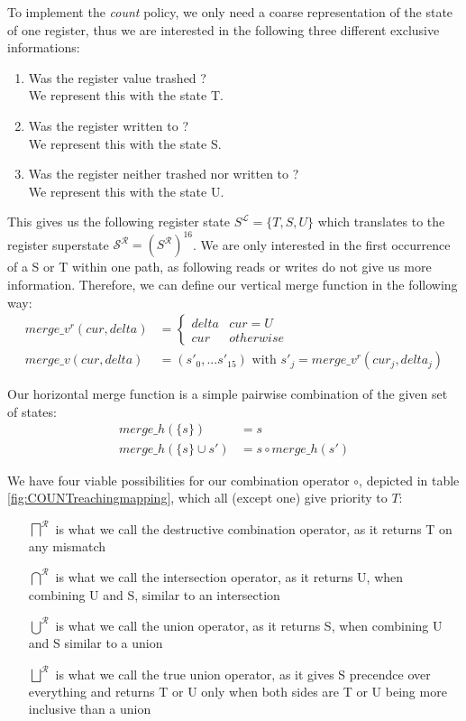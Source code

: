 To implement the \emph{count} policy, we only need a coarse representation of the state of one register, thus we are interested in the following three different exclusive informations:
\begin{enumerate}
\item Was the register value trashed ? \\ We represent this with the state T.
\item Was the register written to ? \\ We represent this with the state S.
\item Was the register neither trashed nor written to ? \\ We represent this with the state U.
\end{enumerate}
This gives us the following register state $S^\mathcal{L} = \{ T, S, U \}$ which translates to the register superstate $\mathcal{S}^\mathcal{R} = (S^\mathcal{R})^{16}$.
We are only interested in the first occurrence of a S or T within one path, as following reads or writes do not give us more information.
Therefore, we can define our vertical merge function in the following way:
\begin{align}
merge\_v^{r} (cur, delta) &= \left\{
  \begin{array}{lr}
     delta & cur = U \\
     cur & otherwise
  \end{array}
\right. \\
merge\_v (cur, delta) &= (s'_0, ... s'_15) \text { with } s'_j = merge\_v^{r}(cur_j, delta_j)
\end{align}

Our horizontal merge function is a simple pairwise combination of the given set of states:
\begin{align}
merge\_h(\{s\}) &= s\\
merge\_h(\{s\} \cup s') &= s \circ merge\_h(s')
\end{align}

We have four viable possibilities for our combination operator $\circ$, depicted in table \ref{fig:COUNTreachingmapping}, which all (except one) give priority to $T$:
\begin{itemize}
\item [$\bigsqcap^{\mathcal{R}}$] is what we call the destructive combination operator, as it returns T on any mismatch
\item [$\bigcap^{\mathcal{R}}$] is what we call the intersection operator, as it returns U, when combining U and S, similar to an intersection
\item [$\bigcup^{\mathcal{R}}$] is what we call the union operator, as it returns S, when combining U and S similar to a union
\item [$\bigsqcup^{\mathcal{R}}$] is what we call the true union operator, as it gives S precendce over everything and returns T or U only when both sides are T or U being more inclusive than a union
\end{itemize}

